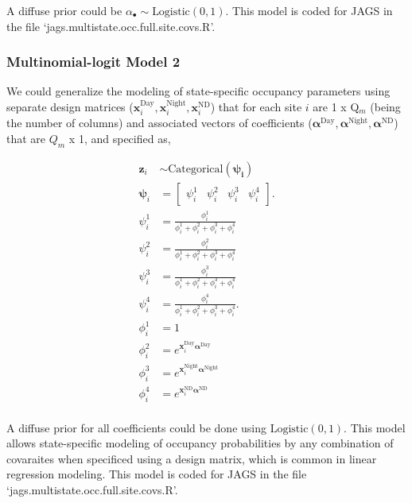\documentclass[12pt]{article}
\begin{document}
A diffuse prior could be $\alpha_{\bullet} \sim \text{Logistic}(0,1).$ This model is coded for JAGS in the file `jags.multistate.occ.full.site.covs.R'.

\subsubsection{Multinomial-logit Model 2}
We could generalize the modeling of state-specific occupancy parameters using separate design matrices ($\textbf{x}_{i}^{\text{Day}}, \textbf{x}_{i}^{\text{Night}}, \textbf{x}_{i}^{\text{ND}}$) that for each site $i$ are  1 x Q$_{m}$ (being the number of columns) and associated vectors of coefficients ($\boldsymbol{\alpha}^{\text{Day}}, \boldsymbol{\alpha}^{\text{Night}}, \boldsymbol{\alpha}^{\text{ND}}$) that are $Q_{m}$ x 1, and specified as,
\begin{center}
\begin{align*}
\textbf{z}_{i} &\sim \text{Categorical}(\boldsymbol{\psi_{i}})\\
\boldsymbol{\psi}_{i} &= \begin{bmatrix} \psi^1_{i} & \psi^2_{i} & \psi^3_{i} & \psi^4_{i} \end{bmatrix}.\\
\psi^1_{i} &=\frac{\phi^1_{i}}{\phi^1_{i}+ \phi^2_{i}+\phi^3_{i}+\phi^4_{i}}\\
\psi^2_{i} &=\frac{\phi^2_{i}}{\phi^1_{i}+ \phi^2_{i}+\phi^3_{i}+\phi^4_{i}}\\
\psi^3_{i} &=\frac{\phi^3_{i}}{\phi^1_{i}+ \phi^2_{i}+\phi^3_{i}+\phi^4_{i}}\\
\psi^4_{i} &=\frac{\phi^4_{i}}{\phi^1_{i}+ \phi^2_{i}+\phi^3_{i}+\phi^4_{i}}.\\
\phi^1_{i} &= 1\\
\phi^2_{i} &= e^{\textbf{x}_{i}^{\text{Day}}\boldsymbol{\alpha}^{\text{Day}}}\\
\phi^3_{i} &= e^{\textbf{x}_{i}^{\text{Night}}\boldsymbol{\alpha}^{\text{Night}}}\\
\phi^4_{i} &= e^{\textbf{x}_{i}^{\text{ND}}\boldsymbol{\alpha}^{\text{ND}}}\\
\end{align*}
\end{center}

A diffuse prior for all coefficients could be done using $\text{Logistic}(0,1).$ This model allows state-specific modeling of occupancy probabilities by any combination of covaraites when specificed using a design matrix, which is common in linear regression modeling. This model is coded for JAGS in the file `jags.multistate.occ.full.site.covs.R'.
\end{document}
